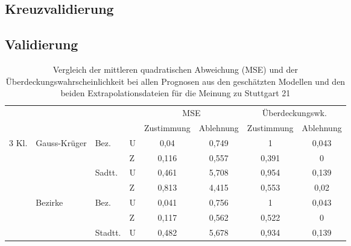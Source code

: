 \documentclass{Vorlage}
\begin{document}
\subsection{Kreuzvalidierung}

\subsection{Validierung}
\begin{table}[h]
\centering
\caption{Vergleich der mittleren quadratischen Abweichung (MSE) und der Überdeckungswahrscheinlichkeit bei allen Prognosen aus den geschätzten Modellen und den beiden Extrapolationsdateien für die Meinung zu Stuttgart 21}
\label{vali}
\begin{tabular}{llll|cc|cc}
\hline \hline
                        &                               &                          &   & \multicolumn{2}{c|}{MSE} & \multicolumn{2}{c}{Überdeckungswk.} \\
                        &                               &                          &   & Zustimmung  & Ablehnung  & Zustimmung        & Ablehnung       \\ \hline
\multirow{12}{*}{3 Kl.} & \multirow{4}{*}{Gauss-Krüger} & \multirow{2}{*}{Bez.}    & U & 0,04        & 0,749      & 1                 & 0,043           \\
                        &                               &                          & Z & 0,116       & 0,557      & 0,391             & 0               \\ \cline{3-8} 
                        &                               & \multirow{2}{*}{Sadtt.}  & U & 0,461       & 5,708      & 0,954             & 0,139           \\
                        &                               &                          & Z & 0,813       & 4,415      & 0,553             & 0,02            \\ \cline{2-8} 
                        & \multirow{4}{*}{Bezirke}      & \multirow{2}{*}{Bez.}    & U & 0,041       & 0,756      & 1                 & 0,043           \\
                        &                               &                          & Z & 0,117       & 0,562      & 0,522             & 0               \\ \cline{3-8} 
                        &                               & \multirow{2}{*}{Stadtt.} & U & 0,482       & 5,678      & 0,934             & 0,139           \\

\end{tabular}
\end{table}
\end{document}

